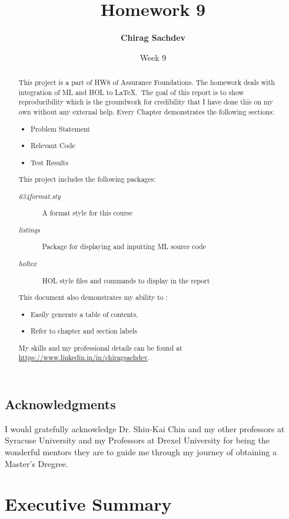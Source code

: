 \documentclass{report}
\title{Homework 9}
\author{\textbf{Chirag Sachdev}}
\date{Week 9}
\begin{document}
\lstset{language=ML}
\maketitle{}

\begin{abstract}
This project is a part of HW8 of Assurance Foundations. The homework deals with integration of ML and HOL to \LaTeX.\ The goal of this report is to show reproducibility which is the groundwork for credibility that I have done this on my own without any external help. Every Chapter demonstrates the following sections:
	\begin{itemize}
		\item Problem Statement
		\item Relevant Code
		\item Test Results
	\end{itemize}
	
This project includes the following packages:
	\begin{description}
		\item[\emph{634format.sty}] A format style for this course
		\item[\emph{listings}] Package for displaying and inputting ML source code
		\item[\emph{holtex}] HOL style files and commands to display in the report
	\end{description}

This document also demonstrates my ability to :
	\begin{itemize}
		\item Easily generate a table of contents,
		\item Refer to chapter and section labels
	\end{itemize}

My skills and my professional details can be found at \url{https://www.linkedin.in/in/chiragsachdev}.
\end{abstract}

\section*{Acknowledgments}
I would gratefully acknowledge Dr. Shiu-Kai Chin and my other professors at Syracuse University and my Professors at Drexel University for being the wonderful mentors they are to guide me through my journey of obtaining a Master's Dregree.

\tableofcontents{}

\chapter{Executive Summary}
\label{cha:executive-summary}
\end{document}
